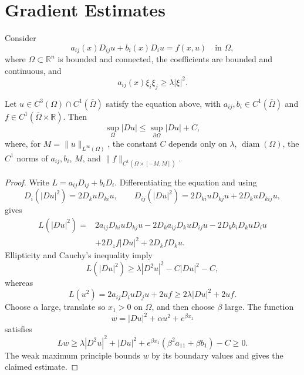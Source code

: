 \section{Gradient Estimates}\label{hanlin:maxprin-section-2-4}

Consider
\[
a_{ij}(x)D_{ij}u+b_i(x)D_iu=f(x,u)
\quad\text{in }\Omega,
\]
where $\Omega\subset\mathbb R^n$ is bounded and connected, the coefficients are
bounded and continuous, and
\[
a_{ij}(x)\xi_i\xi_j\ge\lambda|\xi|^2.
\]

\begin{theorem}\label{hanlin:maxprin-theorem-2-27}
Let $u\in C^3(\Omega)\cap C^1(\overline\Omega)$ satisfy the equation above, with
$a_{ij},b_i\in C^1(\overline\Omega)$ and
$f\in C^1(\overline\Omega\times\mathbb R)$. Then
\[
\sup_\Omega|Du|\le\sup_{\partial\Omega}|Du|+C,
\]
where, for $M=\|u\|_{L^\infty(\Omega)}$, the constant $C$ depends only on
$\lambda$, $\operatorname{diam}(\Omega)$, the $C^1$ norms of $a_{ij},b_i$, $M$,
and $\|f\|_{C^1(\overline\Omega\times[-M,M])}$.
\end{theorem}
\begin{proof}
\sketch Write $L=a_{ij}D_{ij}+b_iD_i$. Differentiating the equation and using
\[
D_i(|Du|^2)=2D_kuD_{ki}u,
\qquad
D_{ij}(|Du|^2)=2D_{ki}uD_{kj}u+2D_kuD_{kij}u,
\]
gives
\[
\begin{split}
L(|Du|^2)={}&2a_{ij}D_{ki}uD_{kj}u
-2D_ka_{ij}D_kuD_{ij}u-2D_kb_iD_kuD_iu\\
&+2D_zf|Du|^2+2D_kfD_ku.
\end{split}
\]
Ellipticity and Cauchy's inequality imply
\[
L(|Du|^2)\ge\lambda|D^2u|^2-C|Du|^2-C,
\]
whereas
\[
L(u^2)=2a_{ij}D_iuD_ju+2uf
\ge2\lambda|Du|^2+2uf.
\]
Choose $\alpha$ large, translate so $x_1>0$ on $\Omega$, and then choose
$\beta$ large. The function
\[
w=|Du|^2+\alpha u^2+e^{\beta x_1}
\]
satisfies
\[
Lw\ge\lambda|D^2u|^2+|Du|^2
+e^{\beta x_1}(\beta^2a_{11}+\beta b_1)-C\ge0.
\]
The weak maximum principle bounds $w$ by its boundary values and gives the
claimed estimate.
\end{proof}

